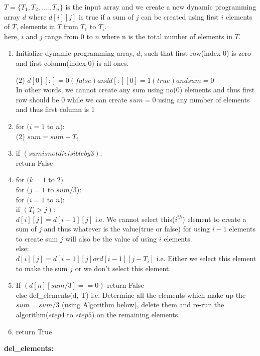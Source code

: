 \documentclass[11pt]{article}
\begin{document}
$T = \{T_1, T_2,...., T_n \}$ is the input array and we create a new dynamic programming array $d$ where $d[i][j]$ is true 
if a sum of $j$ can be created using first $i$ elements of $T$, elements in $T$ from $T_1$ to $T_i$. \\
here, $i$ and $j$ range from $0$ to $n$ where n is the total number of elements in $T$.
\begin{enumerate}
	\item Initialize dynamic programming array, $d$, such that first row(index $0$) is zero and first column(index $0$) is all ones.
	
	\indent (2) $d[0][:] = 0(false) and d[:][0] = 1(true) and sum = 0$ \\
	In other words, we cannot create any sum using no($0$) elements and thus first row should be $0$ while we can create $sum = 0$ 
	using any  number of elements and thus first column is $1$
	\item for $(i = 1$ to $n)$: \\
	\indent (2) $sum = sum + T_i$
	\item if $(sum is not divisible by 3)$: \\
	\indent return False
	\item for $(k = 1$ to $2)$ \\
	\indent for $(j = 1$ to $sum/3$): \\
	\indent \indent for $(i = 1$ to $n$): \\
	\indent \indent \indent if $(T_i > j)$: \\
	\indent \indent \indent \indent $d[i][j] = d[i-1][j]$ i.e. We cannot select this($i^{th}$) element to create a sum of $j$ and 
	thus whatever is the value(true or false) for using $i-1$ elements to create sum $j$ will also be the value of using $i$ 
	elements. \\
	\indent else: \\
	\indent  $d[i][j] = d[i-1][j] or d[i-1][j-T_i]$ i.e. Either we select this element to make the sum $j$ or we 
	don't select this element.
	\item If $(d[n][sum/3] == 0)$ return False \\
	\indent else del\_elements(d, T) i.e. Determine all the elements which make up the $sum = sum/3$ (using Algorithm below), delete 
	them and re-run the algorithm($step 4$ to $step 5$) on the remaining elements.
	\item return True
\end{enumerate}

\textbf{del\_elements:}
\end{document}

